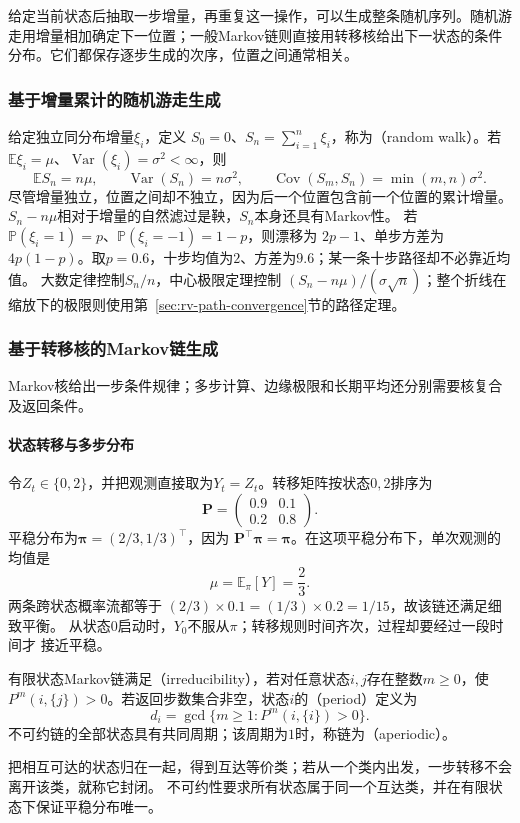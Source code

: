 给定当前状态后抽取一步增量，再重复这一操作，可以生成整条随机序列。随机游走用增量相加确定下一位置；一般Markov链则直接用转移核给出下一状态的条件分布。它们都保存逐步生成的次序，位置之间通常相关。
\label{sec:rv-state-generation}


\subsubsection{基于增量累计的随机游走生成}
\label{sec:rv-random-walk}
给定独立同分布增量\(\xi_i\)，定义
\(S_0=0\)、\(S_n=\sum_{i=1}^n\xi_i\)，称为（random walk）。若
\(\mathbb E\xi_i=\mu\)、\(\operatorname{Var}(\xi_i)=\sigma^2<\infty\)，则
\[
\mathbb ES_n=n\mu,\qquad
\operatorname{Var}(S_n)=n\sigma^2,\qquad
\operatorname{Cov}(S_m,S_n)=\min(m,n)\sigma^2.
\]
尽管增量独立，位置之间却不独立，因为后一个位置包含前一个位置的累计增量。
\(S_n-n\mu\)相对于增量的自然滤过是鞅，\(S_n\)本身还具有Markov性。
若\(\mathbb P(\xi_i=1)=p\)、\(\mathbb P(\xi_i=-1)=1-p\)，则漂移为
\(2p-1\)、单步方差为\(4p(1-p)\)。取\(p=0.6\)，十步均值为\(2\)、方差为\(9.6\)；某一条十步路径却不必靠近均值。
大数定律控制\(S_n/n\)，中心极限定理控制
\((S_n-n\mu)/(\sigma\sqrt n)\)；整个折线在缩放下的极限则使用第~\ref{sec:rv-path-convergence}节的路径定理。

\subsubsection{基于转移核的Markov链生成}
Markov核给出一步条件规律；多步计算、边缘极限和长期平均还分别需要核复合及返回条件。

\paragraph{状态转移与多步分布}
\begin{example}[相关的两状态观测]
  \label{ex:stoch-two-state-chain}
  令$Z_t\in\{0,2\}$，并把观测直接取为$Y_t=Z_t$。转移矩阵按状态$0,2$排序为
  \[
    \bm{P}
    =
    \begin{pmatrix}
      0.9 & 0.1\\
      0.2 & 0.8
    \end{pmatrix}.
  \]
  平稳分布为$\bm{\pi}=(2/3,1/3)^\top$，因为
  $\bm{P}^{\top}\bm{\pi}=\bm{\pi}$。在这项平稳分布下，单次观测的均值是
  \[
    \mu=\mathbb{E}_{\pi}[Y]=\frac23.
  \]
  两条跨状态概率流都等于
  $(2/3)\times0.1=(1/3)\times0.2=1/15$，故该链还满足细致平衡。
  从状态$0$启动时，$Y_0$不服从$\pi$；转移规则时间齐次，过程却要经过一段时间才
  接近平稳。
\end{example}
\begin{definition}[有限链的不可约性与周期]
  \label{def:stoch-finite-irreducibility-period}
  有限状态Markov链满足（irreducibility），若对任意状态\(i,j\)存在整数\(m\geq0\)，使\(P^m(i,\{j\})>0\)。若返回步数集合非空，状态\(i\)的（period）定义为
  \[ d_i=\gcd\{m\geq1:P^m(i,\{i\})>0\}. \]
  不可约链的全部状态具有共同周期；该周期为\(1\)时，称链为（aperiodic）。
\end{definition}
把相互可达的状态归在一起，得到互达等价类；若从一个类内出发，一步转移不会离开该类，就称它封闭。
不可约性要求所有状态属于同一个互达类，并在有限状态下保证平稳分布唯一。

